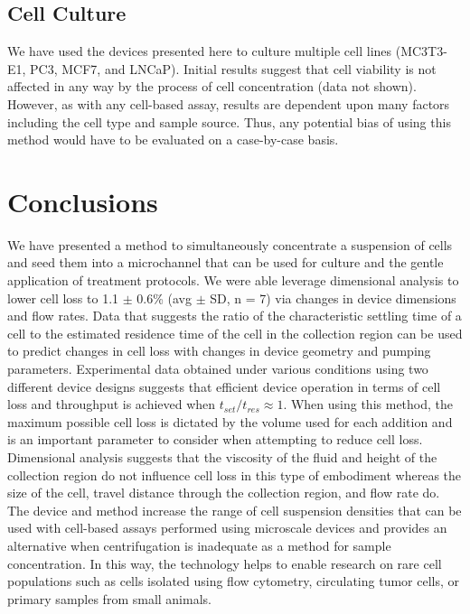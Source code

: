 \subsection{Cell Culture}

We have used the devices presented here to culture multiple cell lines (MC3T3-E1, PC3, MCF7, and LNCaP). Initial results suggest that cell viability is not affected in any way by the process of cell concentration (data not shown). However, as with any cell-based assay, results are dependent upon many factors including the cell type and sample source. Thus, any potential bias of using this method would have to be evaluated on a case-by-case basis.

\section{Conclusions}

We have presented a method to simultaneously concentrate a suspension of cells and seed them into a microchannel that can be used for culture and the gentle application of treatment protocols. We were able leverage dimensional analysis to lower cell loss to 1.1 $\pm$ 0.6\% (avg $\pm$ SD, n = 7) via changes in device dimensions and flow rates. Data that suggests the ratio of the characteristic settling time of a cell to the estimated residence time of the cell in the collection region can be used to predict changes in cell loss with changes in device geometry and pumping parameters. Experimental data obtained under various conditions using two different device designs suggests that efficient device operation in terms of cell loss and throughput is achieved when $t_{set}/t_{res} \approx 1$. When using this method, the maximum possible cell loss is dictated by the volume used for each addition and is an important parameter to consider when attempting to reduce cell loss. Dimensional analysis suggests that the viscosity of the fluid and height of the collection region do not influence cell loss in this type of embodiment whereas the size of the cell, travel distance through the collection region, and flow rate do. The device and method increase the range of cell suspension densities that can be used with cell-based assays performed using microscale devices and provides an alternative when centrifugation is inadequate as a method for sample concentration. In this way, the technology helps to enable research on rare cell populations such as cells isolated using flow cytometry, circulating tumor cells, or primary samples from small animals. 

